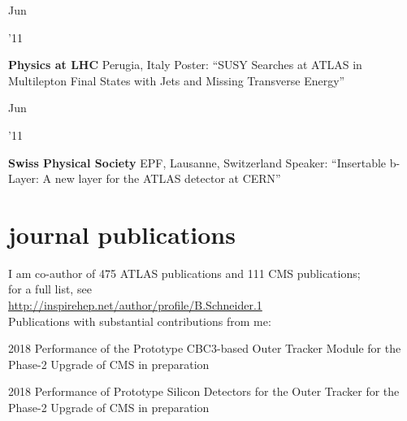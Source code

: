 \documentclass[]{cv} %
\begin{document}
\begin{entrylist}
  \entry
  {\parbox[t]{\parboxWidthOne}{Jun}\parbox[t]{\parboxWidthTwo}{\hfill '11}}
  {\textbf{Physics at LHC}}
  {Perugia, Italy}
  {Poster: ``SUSY Searches at ATLAS in Multilepton Final States with Jets and Missing Transverse Energy''}

  \entry
  {\parbox[t]{\parboxWidthOne}{Jun}\parbox[t]{\parboxWidthTwo}{\hfill '11}}
  {\textbf{Swiss Physical Society}}
  {EPF, Lausanne, Switzerland}
  {Speaker: ``Insertable b-Layer: A new layer for the ATLAS detector at CERN''}

\end{entrylist}

\section{journal publications}
\begin{entrylist}

  \entry
  {}
  {I am co-author of 475 ATLAS publications and 111 CMS publications;\\
  for a full list, see \\
    \href{http://inspirehep.net/author/profile/B.Schneider.1}{http://inspirehep.net/author/profile/B.Schneider.1}\\
  Publications with substantial contributions from me:}
  {}
  {\vspace*{\spacingPubs}}

  \entry
  {2018}
  {Performance of the Prototype CBC3-based Outer Tracker Module for the Phase-2
  Upgrade of CMS}
  {in preparation}
  {\vspace*{\spacingPubs}}

  \entry
  {2018}
  {Performance of Prototype Silicon Detectors for the Outer Tracker for the
  Phase-2 Upgrade of CMS}
  {in preparation}
  {\vspace*{\spacingPubs}}

\end{entrylist}
\end{document}
